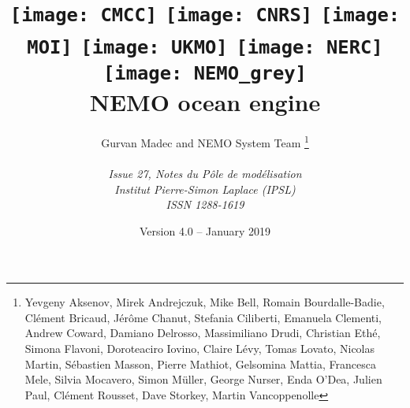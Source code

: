 \documentclass{book}
\newcommand{\biblio}{}
\newcommand{\pindex}{\printindex}
\begin{document}
\renewcommand{\biblio}{}
\renewcommand{\pindex}{}



\title{
  \texttt{[image: CMCC]}\hfill
  \texttt{[image: CNRS]}\hfill
  \texttt{[image: MOI]} \hfill
  \texttt{[image: UKMO]}\hfill
  \texttt{[image: NERC]}       \\
  \texttt{[image: NEMO\_grey]}  \\
  {\Huge NEMO ocean engine}                            \\
}
\author{
  \Large Gurvan Madec and NEMO System Team
  \thanks{
    Yevgeny Aksenov, Mirek Andrejczuk, Mike Bell, Romain Bourdalle-Badie, Cl\'{e}ment Bricaud,
    J\'{e}r\^{o}me Chanut, Stefania Ciliberti, Emanuela Clementi, Andrew Coward, Damiano Delrosso,
    Massimiliano Drudi, Christian Eth\'{e}, Simona Flavoni, Doroteaciro Iovino, Claire L\'{e}vy, Tomas Lovato,
    Nicolas Martin, S\'{e}bastien Masson, Pierre Mathiot, Gelsomina Mattia, Francesca Mele, Silvia Mocavero,
    Simon M\"{u}ller, George Nurser, Enda O'Dea, Julien Paul, Cl\'{e}ment Rousset, Dave Storkey,
    Martin Vancoppenolle
  }                                                        \\
                                                           \\
  \textit{Issue 27, Notes du P\^{o}le de mod\'{e}lisation} \\
  \textit{Institut Pierre-Simon Laplace (IPSL)}            \\
  \textit{ISSN 1288-1619}
}
\date{Version 4.0 -- January 2019}

\maketitle
\frontmatter


\dominitoc
\tableofcontents



\mainmatter




\end{document}
